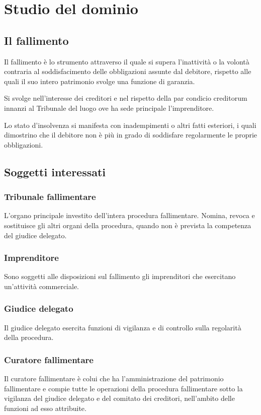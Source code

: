 \section{Studio del dominio}


\subsection{Il fallimento}
Il fallimento è lo strumento attraverso il quale si supera l'inattività o la volontà contraria al soddisfacimento delle obbligazioni assunte dal debitore, rispetto alle quali il suo intero patrimonio svolge una funzione di garanzia.

Si svolge nell'interesse dei creditori e nel rispetto della par condicio creditorum innanzi al Tribunale del luogo ove ha sede principale l'imprenditore.

Lo stato d'insolvenza si manifesta con inadempimenti o altri fatti esteriori, i quali dimostrino che il debitore non è più in grado di soddisfare regolarmente le proprie obbligazioni.

\subsection{Soggetti interessati}

\subsubsection{Tribunale fallimentare}
L'organo principale investito dell'intera procedura fallimentare. Nomina, revoca e sostituisce gli altri organi della procedura, quando non è prevista la competenza del giudice delegato.

\subsubsection{Imprenditore}
Sono soggetti alle disposizioni sul fallimento gli imprenditori che esercitano un'attività commerciale.

\subsubsection{Giudice delegato}
Il giudice delegato esercita funzioni di vigilanza e di controllo sulla regolarità della procedura.

\subsubsection{Curatore fallimentare}
Il curatore fallimentare è colui che ha l’amministrazione del patrimonio fallimentare e compie tutte le operazioni della procedura fallimentare sotto la vigilanza del giudice delegato e del comitato dei creditori, nell’ambito delle funzioni ad esso attribuite.


